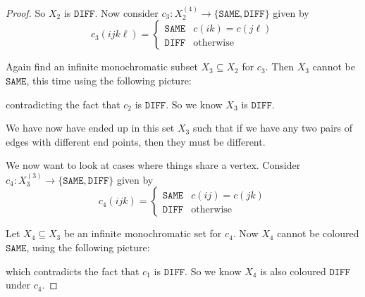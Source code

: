 \documentclass[a4paper]{article}
\begin{document}
\begin{proof}
  So $X_2$ is $\mathtt{DIFF}$. Now consider $c_3: X_2^{(4)} \to \{\mathtt{SAME}, \mathtt{DIFF}\}$ given by
  \[
    c_3(ijk\ell) =
    \begin{cases}
      \mathtt{SAME} & c(ik) = c(j\ell)\\
      \mathtt{DIFF} & \mathrm{otherwise}
    \end{cases}
  \]
  \begin{center}
  \end{center}
  Again find an infinite monochromatic subset $X_3 \subseteq X_2$ for $c_3$. Then $X_3$ cannot be $\mathtt{SAME}$, this time using the following picture:
  \begin{center}
  \end{center}
  contradicting the fact that $c_2$ is $\mathtt{DIFF}$. So we know $X_3$ is $\mathtt{DIFF}$.

  We have now have ended up in this set $X_3$ such that if we have any two pairs of edges with different end points, then they must be different.

  We now want to look at cases where things share a vertex. Consider $c_4: X_3^{(3)} \to \{\mathtt{SAME}, \mathtt{DIFF}\}$ given by
  \[
    c_4(ijk) =
    \begin{cases}
      \mathtt{SAME} & c(ij) = c(jk)\\
      \mathtt{DIFF} & \mathrm{otherwise}
    \end{cases}
  \]
  \begin{center}
  \end{center}
  Let $X_4 \subseteq X_3$ be an infinite monochromatic set for $c_4$. Now $X_4$ cannot be coloured $\mathtt{SAME}$, using the following picture:
  \begin{center}
  \end{center}
  which contradicts the fact that $c_1$ is $\mathtt{DIFF}$. So we know $X_4$ is also coloured $\mathtt{DIFF}$ under $c_4$.


\end{proof}
\end{document}
